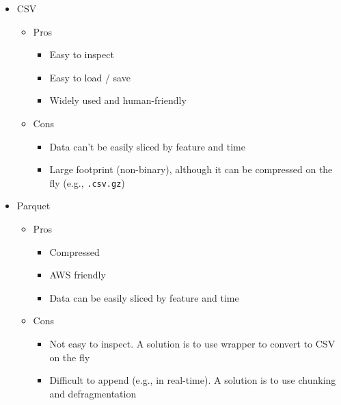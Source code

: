 \documentclass[11pt, reqno]{amsart}
\theoremstyle{definition}
\theoremstyle{remark}
\begin{document}
  \begin{itemize}
    \item CSV
      \begin{itemize}
        \item Pros
          \begin{itemize}
            \item Easy to inspect

            \item Easy to load / save

            \item Widely used and human-friendly
          \end{itemize}

        \item Cons
          \begin{itemize}
            \item Data can't be easily sliced by feature and time

            \item Large footprint (non-binary), although it can be compressed on
              the fly (e.g., \verb|.csv.gz|)
          \end{itemize}
      \end{itemize}

    \item Parquet
      \begin{itemize}
        \item Pros
          \begin{itemize}
            \item Compressed

            \item AWS friendly

            \item Data can be easily sliced by feature and time
          \end{itemize}

        \item Cons
          \begin{itemize}
            \item Not easy to inspect. A solution is to use wrapper to convert
              to CSV on the fly

            \item Difficult to append (e.g., in real-time). A solution is to use
              chunking and defragmentation
          \end{itemize}
      \end{itemize}


\end{itemize}
\end{document}
